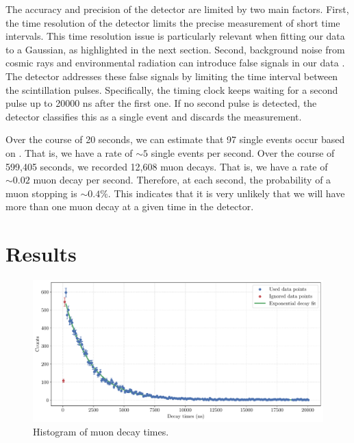 \documentclass{../paper}
\begin{document}
The accuracy and precision of the detector are limited by two main factors. First, the time resolution of the detector limits the precise measurement of short time intervals. This time resolution issue is particularly relevant when fitting our data to a Gaussian, as highlighted in the next section. Second, background noise from cosmic rays and environmental radiation can introduce false signals in our data \cite{TeachSpinManual}. The detector addresses these false signals by limiting the time interval between the scintillation pulses. Specifically, the timing clock keeps waiting for a second pulse up to 20000 ns after the first one. If no second pulse is detected, the detector classifies this as a single event and discards the measurement.

Over the course of 20 seconds, we can estimate that 97 single events occur based on \cite{Sage}. That is, we have a rate of $\sim 5$ single events per second. Over the course of 599,405 seconds, we recorded 12,608 muon decays. That is, we have a rate of $\sim 0.02$ muon decay per second. Therefore, at each second, the probability of a muon stopping is $\sim 0.4\%$. This indicates that it is very unlikely that we will have more than one muon decay at a given time in the detector.

\section{Results}

\begin{figure}
  \centering
  \includegraphics[width=\textwidth]{data/analysis.pdf}
  \caption{Histogram of muon decay times.}
  \label{fig:analysis}
\end{figure}
\end{document}
